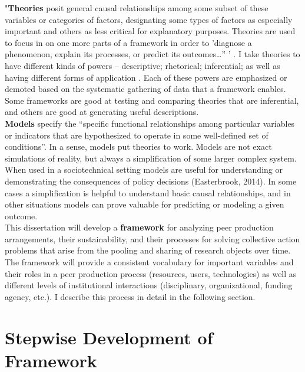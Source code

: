 \documentclass[thesis,tocnosub,noragright,centerchapter,12pt]{uiucecethesis09}
\begin{document}
{"\textbf{Theories} posit general causal relationships among some subset of these
variables or categories of factors, designating some types of factors as
especially important and others as less critical for explanatory
purposes. Theories are used to focus in on one more parts of a framework
in order to 'diagnose a phenomenon, explain its processes, or predict
its outcomes\ldots{}'' \citep[p. 28-9]{ostrom1990governing}' \citep[p. 170]{mcginnis2011introduction}. I take theories to
have different kinds of powers -- descriptive; rhetorical; inferential;
as well as having different forms of application \citep{halverson2002activity}. Each of these powers
are emphasized or demoted based on the systematic gathering of data that
a framework enables. Some frameworks are good at testing and comparing theories that are inferential, and others are good at generating useful descriptions.\\

\textbf{Models} specify the ``specific functional relationships among particular
variables or indicators that are hypothesized to operate in some
well-defined set of conditions''\citep{mcginnis2011introduction}. In a sense, models put theories to work.  Models are not exact
simulations of reality, but always a simplification of some larger
complex system. When used in a sociotechnical setting models are useful for understanding or demonstrating the consequences of policy decisions (Easterbrook, 2014). In some cases a simplification is
helpful to understand basic causal relationships, and in other situations models can prove valuable for predicting or modeling a given outcome.\\

This dissertation will develop a \textbf{framework} for analyzing peer production arrangements, their sustainability, and their processes for solving collective action problems that arise from the pooling and sharing of research objects over time. The framework will provide a consistent vocabulary for important variables and their roles in a peer production process (resources, users, technologies) as well as different levels of institutional interactions (disciplinary, organizational, funding agency, etc.). I describe this process in detail in the following section.\\

\section{Stepwise Development of Framework} 

}
\end{document}
